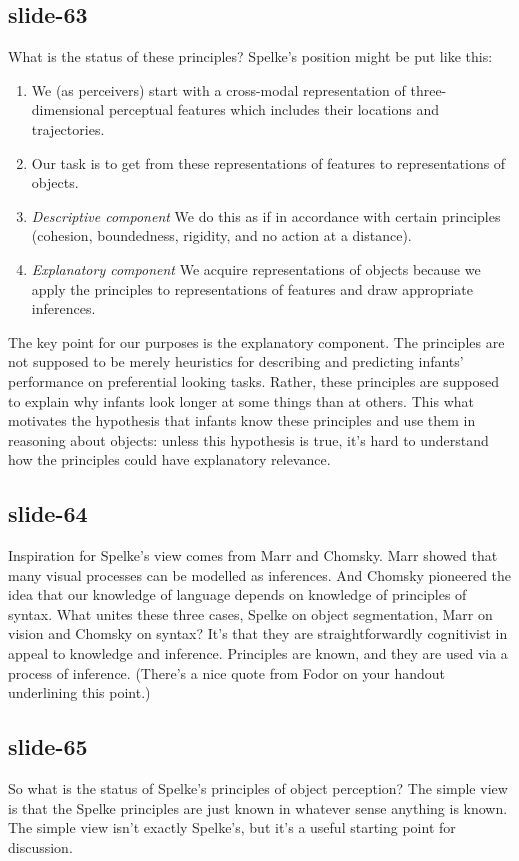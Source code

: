 \documentclass[12pt,\papersize]{extarticle}
\begin{document}
\subsection{slide-63}
What is the status of these principles?
Spelke’s position might be put like this:
\begin{enumerate} \item We (as perceivers) start with a cross-modal representation of three-dimensional perceptual features which includes their locations and trajectories. \item Our task is to get from these representations of features to representations of objects. \item \emph{Descriptive component} We do this as if in accordance with certain principles (cohesion, boundedness, rigidity, and no action at a distance). \item \emph{Explanatory component} We acquire representations of objects because we apply the principles to representations of features and draw appropriate inferences. \end{enumerate}
The key point for our purposes is the explanatory component.
The principles are not supposed to be merely heuristics for describing and predicting infants’ performance on preferential looking tasks.
Rather, these principles are supposed to explain why infants look longer at some things than at others.
This what motivates the hypothesis that infants know these principles and use them in reasoning about objects: unless this hypothesis is true, it’s hard to understand how the principles could have explanatory relevance.
 
 
\subsection{slide-64}
Inspiration for Spelke’s view comes from Marr and Chomsky.
Marr showed that many visual processes can be modelled as inferences.
And Chomsky pioneered the idea that our knowledge of language depends on knowledge of principles of syntax.
What unites these three cases, Spelke on object segmentation, Marr on vision and Chomsky on syntax?
It’s that they are straightforwardly cognitivist in appeal to knowledge and inference.
Principles are known, and they are used via a process of inference.
(There’s a nice quote from Fodor on your handout underlining this point.)
 
 
\subsection{slide-65}
So what is the status of Spelke’s principles of object perception?
The simple view is that the Spelke principles are just known in whatever sense anything is known.
The simple view isn’t exactly Spelke’s, but it’s a useful starting point for discussion.
 
\end{document}
